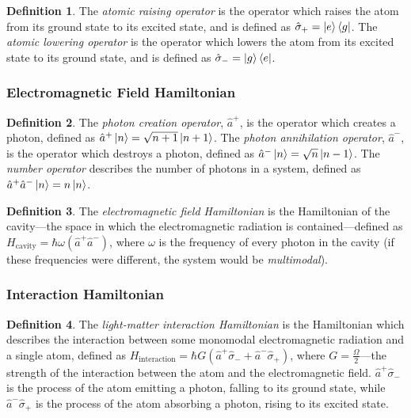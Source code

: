 \documentclass{article}
\theoremstyle{definition}
\newtheorem{definition}{Definition}[section]
\begin{document}
\begin{definition}
    The \emph{atomic raising operator} is the operator which raises the atom from its ground state to its excited state, and is defined as $\hat{\sigma}_{+} = \ket{e}\bra{g}$. The \emph{atomic lowering operator} is the operator which lowers the atom from its excited state to its ground state, and is defined as $\hat{\sigma}_{-} = \ket{g}\bra{e}$.
\end{definition}

\subsubsection{Electromagnetic Field Hamiltonian}
\begin{definition}
    The \emph{photon creation operator}, $\hat{a}^{+}$, is the operator which creates a photon, defined as $\hat{a}^{+}\ket{n} = \sqrt{n + 1}\ket{n + 1}$. The \emph{photon annihilation operator}, $\hat{a}^{-}$, is the operator which destroys a photon, defined as $\hat{a}^{-}\ket{n} = \sqrt{n}\ket{n-1}$. The \emph{number operator} describes the number of photons in a system, defined as $\hat{a}^{+}\hat{a}^{-}\ket{n} = n\ket{n}$.
\end{definition}

\begin{definition}
    The \emph{electromagnetic field Hamiltonian} is the Hamiltonian of the cavity---the space in which the electromagnetic radiation is contained---defined as $H_{\text{cavity}} = \hbar \omega (\hat{a}^{+}\hat{a}^{-})$, where $\omega$ is the frequency of every photon in the cavity (if these frequencies were different, the system would be \emph{multimodal}).
\end{definition}

\subsubsection{Interaction Hamiltonian}
\begin{definition}
    The \emph{light-matter interaction Hamiltonian} is the Hamiltonian which describes the interaction between some monomodal electromagnetic radiation and a single atom, defined as $H_{\text{interaction}} = \hbar G (\hat{a}^{+}\hat{\sigma}_{-} + \hat{a}^{-}\hat{\sigma}_{+})$, where $G = \frac{\Omega}{2}$---the strength of the interaction between the atom and the electromagnetic field. $\hat{a}^{+}\hat{\sigma}_{-}$ is the process of the atom emitting a photon, falling to its ground state, while $\hat{a}^{-}\hat{\sigma}_{+}$ is the process of the atom absorbing a photon, rising to its excited state.
\end{definition}
\end{document}
